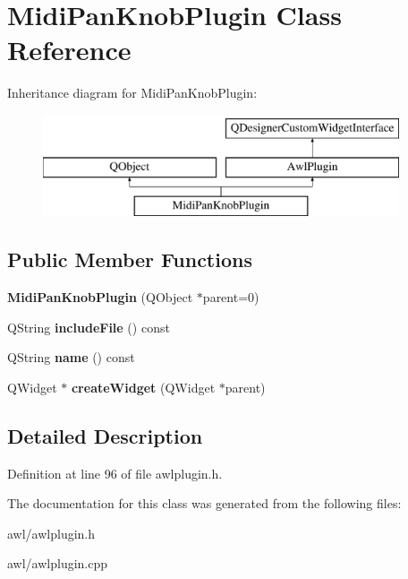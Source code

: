 \hypertarget{class_midi_pan_knob_plugin}{}\section{Midi\+Pan\+Knob\+Plugin Class Reference}
\label{class_midi_pan_knob_plugin}
Inheritance diagram for Midi\+Pan\+Knob\+Plugin\+:\begin{figure}[H]
\begin{center}
\leavevmode
\includegraphics[height=3.000000cm]{class_midi_pan_knob_plugin}
\end{center}
\end{figure}
\subsection*{Public Member Functions}
\begin{DoxyCompactItemize}
\item 
\mbox{\label{class_midi_pan_knob_plugin_aa1849b1ce18920b80c6671048c0f0824}} 
{\bfseries Midi\+Pan\+Knob\+Plugin} (Q\+Object $\ast$parent=0)
\item 
\mbox{\label{class_midi_pan_knob_plugin_af83a67dc0ac4f76ba5f8eb100abf3972}} 
Q\+String {\bfseries include\+File} () const
\item 
\mbox{\label{class_midi_pan_knob_plugin_acb098c71e4b3e01166245fa77fd62a27}} 
Q\+String {\bfseries name} () const
\item 
\mbox{\label{class_midi_pan_knob_plugin_a70627356334c324d4f8c84e4f1bbc124}} 
Q\+Widget $\ast$ {\bfseries create\+Widget} (Q\+Widget $\ast$parent)
\end{DoxyCompactItemize}


\subsection{Detailed Description}


Definition at line 96 of file awlplugin.\+h.



The documentation for this class was generated from the following files\+:\begin{DoxyCompactItemize}
\item 
awl/awlplugin.\+h\item 
awl/awlplugin.\+cpp\end{DoxyCompactItemize}
